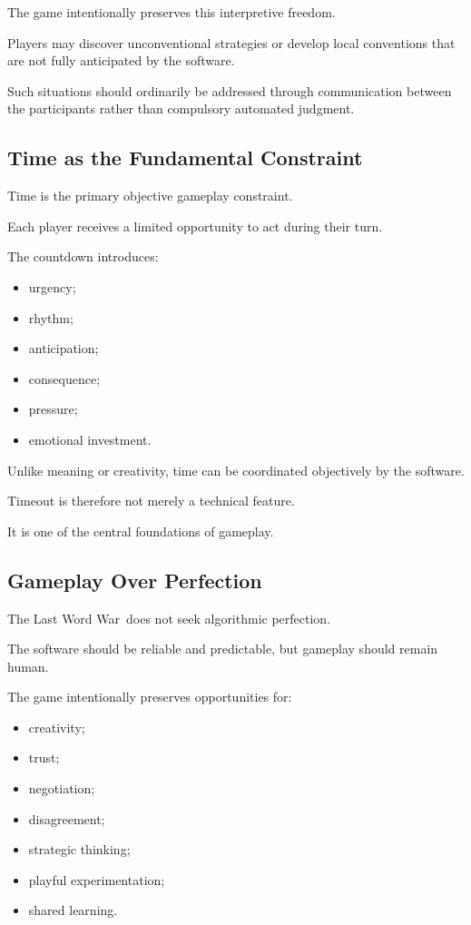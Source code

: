 \documentclass[11pt,a4paper]{article}
\begin{document}
The game intentionally preserves this interpretive freedom.

Players may discover unconventional strategies or develop local conventions that are not fully anticipated by the software.

Such situations should ordinarily be addressed through communication between the participants rather than compulsory automated judgment.

\subsection{Time as the Fundamental Constraint}

Time is the primary objective gameplay constraint.

Each player receives a limited opportunity to act during their turn.

The countdown introduces:

\begin{itemize}
    \item urgency;
    \item rhythm;
    \item anticipation;
    \item consequence;
    \item pressure;
    \item emotional investment.
\end{itemize}

Unlike meaning or creativity, time can be coordinated objectively by the software.

Timeout is therefore not merely a technical feature.

It is one of the central foundations of gameplay.

\subsection{Gameplay Over Perfection}

The Last Word War\texttrademark\ does not seek algorithmic perfection.

The software should be reliable and predictable, but gameplay should remain human.

The game intentionally preserves opportunities for:

\begin{itemize}
    \item creativity;
    \item trust;
    \item negotiation;
    \item disagreement;
    \item strategic thinking;
    \item playful experimentation;
    \item shared learning.
\end{itemize}
\end{document}
